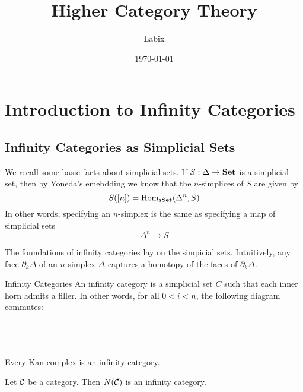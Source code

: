 \documentclass[a4paper]{article}
\title{Higher Category Theory}
\author{Labix}
\date{\today}
\begin{document}
\maketitle
\begin{abstract}
\begin{itemize}
\end{itemize}
\end{abstract}
\pagebreak
\tableofcontents

\pagebreak
\section{Introduction to Infinity Categories}
\subsection{Infinity Categories as Simplicial Sets}
We recall some basic facts about simplicial sets. If $S:\Delta\to\bold{Set}$ is a simplicial set, then by Yoneda's emebdding we know that the $n$-simplices of $S$ are given by $$S([n])=\operatorname{Hom}_\bold{sSet}(\Delta^n,S)$$ In other words, specifying an $n$-simplex is the same as specifying a map of simplicial sets $$\Delta^n\to S$$

The foundations of infinity categories lay on the simpicial sets. Intuitively, any face $\partial_k\Delta$ of an $n$-simplex $\Delta$ captures a homotopy of the faces of $\partial_k\Delta$. 

\begin{defn}{Infinity Categories}{} An infinity category is a simplicial set $C$ such that each inner horn admits a filler. In other words, for all $0<i<n$, the following diagram commutes: \\~\\
\\~\\
\end{defn}

\begin{lmm}{}{} Every Kan complex is an infinity category. 
\end{lmm}

\begin{lmm}{}{} Let $\mathcal{C}$ be a category. Then $N(\mathcal{C})$ is an infinity category. 
\end{lmm}
\end{document}
